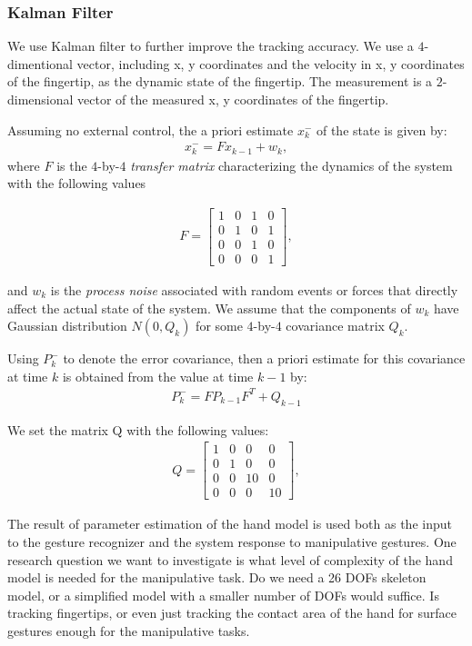 \subsubsection{Kalman Filter}
We use Kalman filter to further improve the tracking accuracy. We use a
$4$-dimentional vector, including x, y coordinates and the velocity in x, y
coordinates of the fingertip, as the dynamic state of the fingertip.
The measurement is a $2$-dimensional vector of the measured x, y
coordinates of the fingertip. 

Assuming no external control, the a priori estimate $x_k^-$ of the state is
given by:
\begin{align*}
x_k^- = Fx_{k - 1} + w_k,
\end{align*}
where $F$ is the $4$-by-$4$ \textit{transfer matrix} characterizing the
dynamics of the system with the following values

\begin{align*}
F = \left[ \begin{array}{cccc}
	1 & 0 & 1 & 0 \\
	0 & 1 & 0 & 1 \\
	0 & 0 & 1 & 0 \\
	0 & 0 & 0 & 1 \end{array} \right],
\end{align*}

and $w_k$ is the
\textit{process noise} associated with random events or forces that directly affect the actual state of the system. We assume that the components of $w_k$
have Gaussian distribution $N(0, Q_k)$ for some $4$-by-$4$ covariance matrix
$Q_k$.

Using $P_k^-$ to denote the error covariance, then a priori estimate for this
covariance at time $k$ is obtained from the value at time $k - 1$ by:
\begin{align*}
P_k^- = FP_{k - 1}F^T + Q_{k - 1}
\end{align*}

We set the matrix Q with the following values:
\begin{align*}
Q = \left[ \begin{array}{cccc}
	1 & 0 & 0 & 0 \\
	0 & 1 & 0 & 0 \\
	0 & 0 & 10 & 0 \\
	0 & 0 & 0 & 10 \end{array} \right],
\end{align*}
  
The result of parameter estimation of the hand model is used both as the input
to the gesture recognizer and the system response to manipulative gestures. One
research question we want to investigate is what level of complexity of the
hand model is needed for the manipulative task. Do we need a 26 DOFs skeleton
model, or a simplified model with a smaller number of DOFs would suffice. Is
tracking fingertips, or even just tracking the contact area of the hand for
surface gestures enough for the manipulative tasks.

